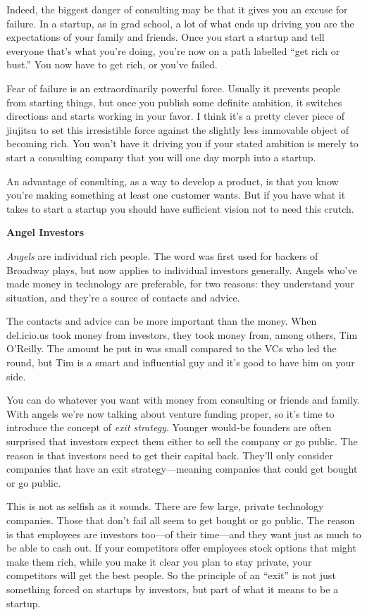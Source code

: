 \documentclass[12pt]{book}
\begin{document}
Indeed, the biggest danger of consulting may be that it gives you an
excuse for failure. In a startup, as in grad school, a lot of what ends
up driving you are the expectations of your family and friends. Once you
start a startup and tell everyone that's what you're doing, you're now
on a path labelled ``get rich or bust.'' You now have to get rich, or
you've failed.

Fear of failure is an extraordinarily powerful force. Usually it
prevents people from starting things, but once you publish some definite
ambition, it switches directions and starts working in your favor. I
think it's a pretty clever piece of jiujitsu to set this irresistible
force against the slightly less immovable object of becoming rich. You
won't have it driving you if your stated ambition is merely to start a
consulting company that you will one day morph into a startup.

An advantage of consulting, as a way to develop a product, is that you
know you're making something at least one customer wants. But if you
have what it takes to start a startup you should have sufficient vision
not to need this crutch.

\textbf{Angel Investors}

\emph{Angels} are individual rich people. The word was first used for
backers of Broadway plays, but now applies to individual investors
generally. Angels who've made money in technology are preferable, for
two reasons: they understand your situation, and they're a source of
contacts and advice.

The contacts and advice can be more important than the money. When
del.icio.us took money from investors, they took money from, among
others, Tim O'Reilly. The amount he put in was small compared to the VCs
who led the round, but Tim is a smart and influential guy and it's good
to have him on your side.

You can do whatever you want with money from consulting or friends and
family. With angels we're now talking about venture funding proper, so
it's time to introduce the concept of \emph{exit strategy}. Younger
would-be founders are often surprised that investors expect them either
to sell the company or go public. The reason is that investors need to
get their capital back. They'll only consider companies that have an
exit strategy---meaning companies that could get bought or go public.

This is not as selfish as it sounds. There are few large, private
technology companies. Those that don't fail all seem to get bought or go
public. The reason is that employees are investors too---of their
time---and they want just as much to be able to cash out. If your
competitors offer employees stock options that might make them rich,
while you make it clear you plan to stay private, your competitors will
get the best people. So the principle of an ``exit'' is not just
something forced on startups by investors, but part of what it means to
be a startup.
\end{document}
